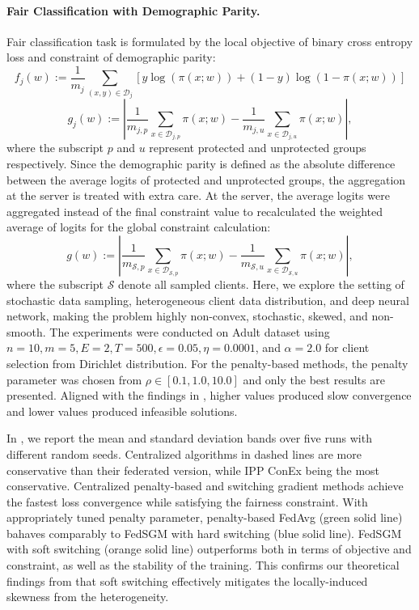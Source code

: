 \documentclass{article} %
\begin{document}
\paragraph{Fair Classification with Demographic Parity. }
Fair classification task is formulated by the local objective of binary cross entropy loss and constraint of demographic parity: $$f_j(w) := \frac{1}{m_j}\sum_{(x,y)\in\mathcal{D}_j}\left[y\log(\pi(x;w)) + (1-y)\log(1-\pi(x;w))\right]$$
$$g_j(w) := \left|\frac{1}{m_{j,p}}\sum_{x\in\mathcal{D}_{j,p}} \pi(x;w) - \frac{1}{m_{j,u}}\sum_{x\in\mathcal{D}_{j,u}} \pi(x;w)\right|,$$
where the subscript $p$ and $u$ represent protected and unprotected groups respectively. Since the demographic parity is defined as the absolute difference between the average logits of protected and unprotected groups, the aggregation at the server is treated with extra care. At the server, the average logits were aggregated instead of the final constraint value to recalculated the weighted average of logits for the global constraint calculation:
$$g(w) := \left|\frac{1}{m_{\mathcal{S},p}}\sum_{x\in\mathcal{D}_{\mathcal{S},p}} \pi(x;w) - \frac{1}{m_{\mathcal{S},u}}\sum_{x\in\mathcal{D}_{\mathcal{S},u}} \pi(x;w)\right|,$$
where the subscript $\mathcal{S}$ denote all sampled clients. Here, we explore the setting of stochastic data sampling, heterogeneous client data distribution, and deep neural network, making the problem highly non-convex, stochastic, skewed, and non-smooth. The experiments were conducted on Adult dataset \citep{kohavi1996adult} using $n=10, m=5, E=2, T=500, \epsilon=0.05, \eta=0.0001$, and $\alpha=2.0$ for client selection from Dirichlet distribution. For the penalty-based methods, the penalty parameter was chosen from $\rho\in[0.1, 1.0, 10.0]$ and only the best results are presented. Aligned with the findings in , higher values produced slow convergence and lower values produced infeasible solutions.

In , we report the mean and standard deviation bands over five runs with different random seeds. Centralized algorithms in dashed lines are more conservative than their federated version, while IPP ConEx being the most conservative. Centralized penalty-based and switching gradient methods achieve the fastest loss convergence while satisfying the fairness constraint. With appropriately tuned penalty parameter, penalty-based FedAvg (green solid line) bahaves comparably to FedSGM with hard switching (blue solid line). FedSGM with soft switching (orange solid line) outperforms both in terms of objective and constraint, as well as the stability of the training. This confirms our theoretical findings from  that soft switching effectively mitigates the locally-induced skewness from the heterogeneity.
\end{document}
